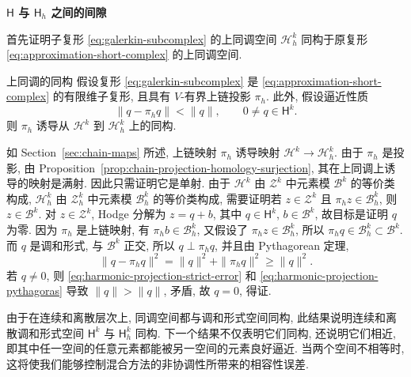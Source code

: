 \medskip\noindent\textbf{{$\mathsf H$ 与 $\mathsf H_h$ 之间的间隙}}\par
{首先证明子复形 \eqref{eq:galerkin-subcomplex} 的上同调空间 $\mathcal H_h^k$ 同构于原复形 \eqref{eq:approximation-short-complex} 的上同调空间.}


\begin{Theorem}{{上同调的同构}}\label{thm:discrete-cohomology-isomorphism}
{假设复形 \eqref{eq:galerkin-subcomplex} 是 \eqref{eq:approximation-short-complex} 的有限维子复形, 且具有 $V$-有界上链投影 $\pi_h$. 此外, 假设逼近性质}
\begin{equation}\label{eq:harmonic-projection-strict-error}
\|q-\pi_hq\|<\|q\|,\qquad0\ne q\in\mathsf H^k.
\end{equation}
{则 $\pi_h$ 诱导从 $\mathcal H^k$ 到 $\mathcal H_h^k$ 上的同构.}
\end{Theorem}

\begin{Proof}
{如 Section~\ref{sec:chain-maps} 所述, 上链映射 $\pi_h$ 诱导映射 $\mathcal H^k\to\mathcal H_h^k$. 由于 $\pi_h$ 是投影, 由 Proposition~\ref{prop:chain-projection-homology-surjection}, 其在上同调上诱导的映射是满射. 因此只需证明它是单射. 由于 $\mathcal H^k$ 由 $\mathcal Z^k$ 中元素模 $\mathcal B^k$ 的等价类构成, $\mathcal H_h^k$ 由 $\mathcal Z_h^k$ 中元素模 $\mathcal B_h^k$ 的等价类构成, 需要证明若 $z\in\mathcal Z^k$ 且 $\pi_hz\in\mathcal B_h^k$, 则 $z\in\mathcal B^k$. 对 $z\in\mathcal Z^k$, Hodge 分解为 $z=q+b$, 其中 $q\in\mathsf H^k$, $b\in\mathcal B^k$, 故目标是证明 $q$ 为零. 因为 $\pi_h$ 是上链映射, 有 $\pi_hb\in\mathcal B_h^k$, 又假设了 $\pi_hz\in\mathcal B_h^k$, 所以 $\pi_hq\in\mathcal B_h^k\subset\mathcal B^k$. 而 $q$ 是调和形式, 与 $\mathcal B^k$ 正交, 所以 $q\perp\pi_hq$, 并且由 Pythagorean 定理,}
\begin{equation}\label{eq:harmonic-projection-pythagoras}
\|q-\pi_hq\|^2=\|q\|^2+\|\pi_hq\|^2\geq\|q\|^2.
\end{equation}
{若 $q\ne0$, 则 \eqref{eq:harmonic-projection-strict-error} 和 \eqref{eq:harmonic-projection-pythagoras} 导致 $\|q\|>\|q\|$, 矛盾, 故 $q=0$, 得证.}
\end{Proof}

{由于在连续和离散层次上, 同调空间都与调和形式空间同构, 此结果说明连续和离散调和形式空间 $\mathsf H^k$ 与 $\mathsf H_h^k$ 同构. 下一个结果不仅表明它们同构, 还说明它们相近, 即其中任一空间的任意元素都能被另一空间的元素良好逼近. 当两个空间不相等时, 这将使我们能够控制混合方法的非协调性所带来的相容性误差.}

